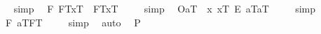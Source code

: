 \begin{isabellebody}
\isadelimproof
\ %
\endisadelimproof
%
\isatagproof
{}\isamarkupfalse%
\ simp\ \isamarkupfalse%
%
\endisatagproof
{\isafoldproof}%
%
\isadelimproof
%
\endisadelimproof
\isanewline
\isanewline
{}\isamarkupfalse%
\ {\isachardoublequoteopen}{\isacharbrackleft}{\isacharparenleft}\isactrlbold {\isasymforall}F{\isachardot}\ {\isasymlparr}F\isactrlsup T{\isacharcomma}x\isactrlsup T{\isasymrparr}\ \isactrlbold {\isasymequiv}\ {\isasymlparr}F\isactrlsup T{\isacharcomma}x\isactrlsup T{\isasymrparr}{\isacharparenright}{\isacharbrackright}\ {\isacharequal}\ {\isasymtop}{\isachardoublequoteclose}%
\isadelimproof
\ %
\endisadelimproof
%
\isatagproof
{}\isamarkupfalse%
\ simp\ \isamarkupfalse%
%
\endisatagproof
{\isafoldproof}%
%
\isadelimproof
%
\endisadelimproof
\isanewline
{}\isamarkupfalse%
\ {\isachardoublequoteopen}{\isacharbrackleft}{\isasymlparr}O{\isacharbang}{\isacharcomma}a\isactrlsup T{\isasymrparr}\ \isactrlbold {\isasymrightarrow}\ {\isasymlparr}{\isacharparenleft}\isactrlbold {\isasymlambda}x{\isachardot}\ {\isacharparenleft}x\isactrlsup T{\isacharparenright}\ \isactrlbold {\isacharequal}\isactrlsub E\ {\isacharparenleft}a\isactrlsup T{\isacharparenright}{\isacharparenright}{\isacharcomma}a\isactrlsup T{\isasymrparr}{\isacharbrackright}\ {\isacharequal}\ {\isasymtop}{\isachardoublequoteclose}%
\isadelimproof
\ %
\endisadelimproof
%
\isatagproof
{}\isamarkupfalse%
\ simp\ \isamarkupfalse%
%
\endisatagproof
{\isafoldproof}%
%
\isadelimproof
%
\endisadelimproof
\isanewline
\isanewline
{}\isamarkupfalse%
\ {\isachardoublequoteopen}{\isacharbrackleft}{\isacharparenleft}\isactrlbold {\isasymexists}F{\isachardot}\ {\isasymlbrace}a\isactrlsup T{\isacharcomma}F\isactrlsup T{\isasymrbrace}{\isacharparenright}{\isacharbrackright}\ {\isacharequal}\ {\isasymtop}{\isachardoublequoteclose}%
\isadelimproof
\ %
\endisadelimproof
%
\isatagproof
{}\isamarkupfalse%
\ simp\ \isamarkupfalse%
\ auto%
\endisatagproof
{\isafoldproof}%
%
\isadelimproof
%
\endisadelimproof
\isanewline
\isanewline
{}\isamarkupfalse%
\ {\isachardoublequoteopen}{\isacharbrackleft}{\isacharparenleft}\isactrlbold {\isasymexists}{\isasymphi}{\isachardot}\ {\isacharparenleft}{\isasymphi}\isactrlsup P{\isacharparenright}{\isacharparenright}{\isacharbrackright}\ {\isacharequal}\ {\isasymtop}{\isachardoublequoteclose}%
\isadelimproof
\ %
\endisadelimproof
%
\isatagproof
{}\isamarkupfalse%

\end{isabellebody}
